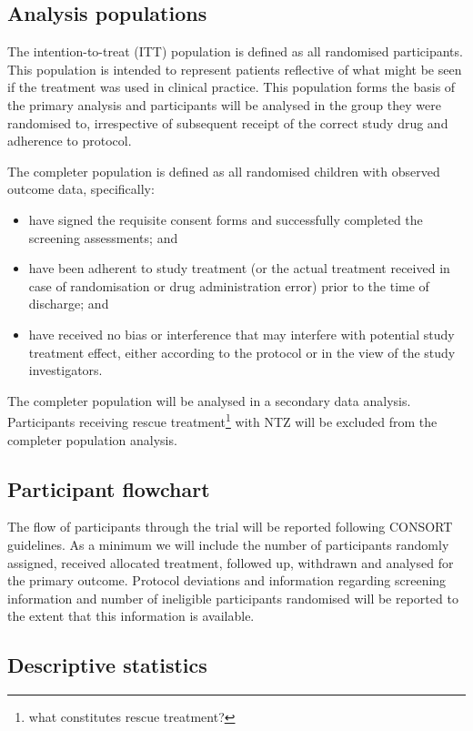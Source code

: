 \documentclass[a4paper]{article}
\begin{document}
\subsection{Analysis populations}

The intention-to-treat (ITT) population is defined as all randomised participants.
This population is intended to represent patients reflective of what might be seen if the treatment was used in clinical practice.
This population forms the basis of the primary analysis and participants will be analysed in the group they were randomised to, irrespective of subsequent receipt of the correct study drug and adherence to protocol.

The completer population is defined as all randomised children with observed outcome data, specifically:
\begin{itemize}
    \item have signed the requisite consent forms and successfully completed the screening assessments; and
    \item have been adherent to study treatment (or the actual treatment received in case of randomisation or drug administration error) prior to the time of discharge; and
    \item have received no bias or interference that may interfere with potential study treatment effect, either according to the protocol or in the view of the study investigators.
\end{itemize}
The completer population will be analysed in a secondary data analysis.
Participants receiving rescue treatment\footnote{what constitutes rescue treatment?} with NTZ will be excluded from the completer population analysis.

\subsection{Participant flowchart}

The flow of participants through the trial will be reported following CONSORT guidelines.
As a minimum we will include the number of participants randomly assigned, received allocated treatment, followed up, withdrawn and analysed for the primary outcome.
Protocol deviations and information regarding screening information and number of ineligible participants randomised will be reported to the extent that this information is available.

\subsection{Descriptive statistics}
\end{document}
